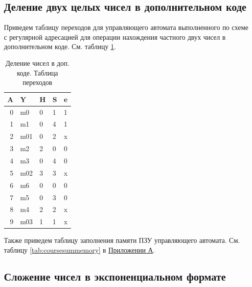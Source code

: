 \documentclass[a4paper,14pt]{extarticle}
\begin{document}
\subsection{Деление двух целых чисел в дополнительном коде}

Приведем таблицу переходов для управляющего автомата выполненного по схеме с регулярной адресацией для операции нахождения частного двух чисел в дополнительном коде. См. таблицу \ref{tab:coursedivsteps}.

\begin{table}[h!]
	\centering
	\begin{tabular}{|r||l|l|l|l|}
		\hline
		\multicolumn{1}{|l||}{\textbf{A}} & \textbf{Y} & \textbf{H} & \textbf{S} & \textbf{e} \\ \hline
		0 & m0 & 0 & 1 & 1 \\ \hline
		1 & m1 & 0 & 4 & 1 \\ \hline
		2 & m01 & 0 & 2 & x \\ \hline
		3 & m2 & 2 & 0 & 0 \\ \hline
		4 & m3 & 0 & 4 & 0 \\ \hline
		5 & m02 & 3 & 3 & x \\ \hline
		6 & m6 & 0 & 0 & 0 \\ \hline
		7 & m5 & 0 & 3 & 0 \\ \hline
		8 & m4 & 2 & 2 & x \\ \hline
		9 & m03 & 1 & 1 & x \\ \hline
	\end{tabular}
	\caption{Деление чисел в доп. коде. Таблица переходов}
	\label{tab:coursedivsteps}

\end{table}



Также приведем таблицу заполнения памяти ПЗУ управляющего автомата. См. таблицу \ref{tab:coursesummemory} в \hyperref[tam]{Приложении А}.

\subsection{Сложение чисел в экспоненциальном формате}
\end{document}
